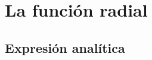 \documentclass[12pt]{beamer}
\begin{document}

\section{La función radial}
\subsection{Expresión analítica}
\end{document}
